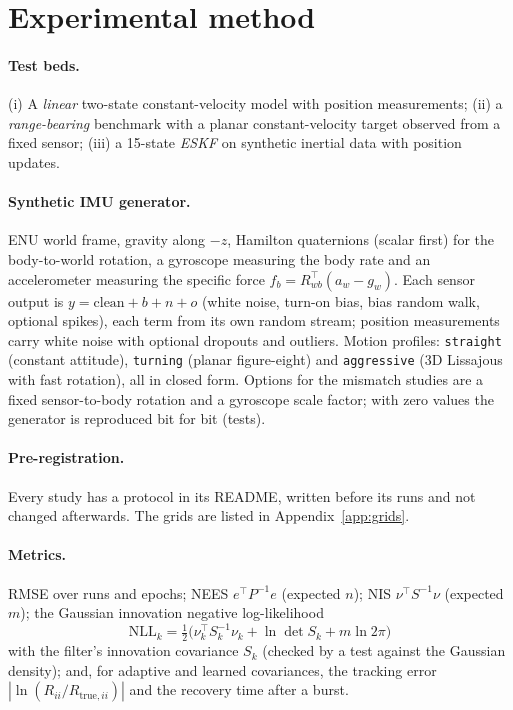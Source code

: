 \documentclass[11pt,a4paper]{article}
\newcommand{\tp}{^{\top}}
\begin{document}
\section{Experimental method}\label{sec:method}

\paragraph{Test beds.} (i) A \emph{linear} two-state constant-velocity model with position
measurements; (ii) a \emph{range-bearing} benchmark with a planar constant-velocity target observed
from a fixed sensor; (iii) a 15-state \emph{ESKF} on synthetic inertial data with position updates.

\paragraph{Synthetic IMU generator.} ENU world frame, gravity along $-z$, Hamilton quaternions
(scalar first) for the body-to-world rotation, a gyroscope measuring the body rate and an
accelerometer measuring the specific force $f_b=R_{wb}\tp(a_w-g_w)$. Each sensor output is
$y=\mathrm{clean}+b+n+o$ (white noise, turn-on bias, bias random walk, optional spikes), each term
from its own random stream; position measurements carry white noise with optional dropouts and
outliers. Motion profiles: \texttt{straight} (constant attitude), \texttt{turning} (planar
figure-eight) and \texttt{aggressive} (3D Lissajous with fast rotation), all in closed form. Options
for the mismatch studies are a fixed sensor-to-body rotation and a gyroscope scale factor; with
zero values the generator is reproduced bit for bit (tests).

\paragraph{Pre-registration.} Every study has a protocol in its README, written before its runs and
not changed afterwards. The grids are listed in Appendix~\ref{app:grids}.

\paragraph{Metrics.} RMSE over runs and epochs; NEES $e\tp P^{-1}e$ (expected $n$); NIS
$\nu\tp S^{-1}\nu$ (expected $m$); the Gaussian innovation negative log-likelihood
\begin{equation}\label{eq:nll}
\mathrm{NLL}_k=\tfrac12\big(\nu_k\tp S_k^{-1}\nu_k+\ln\det S_k+m\ln2\pi\big)
\end{equation}
with the filter's innovation covariance $S_k$ (checked by a test against the Gaussian density); and,
for adaptive and learned covariances, the tracking error $|\ln(R_{ii}/R_{\mathrm{true},ii})|$ and the
recovery time after a burst.
\end{document}
